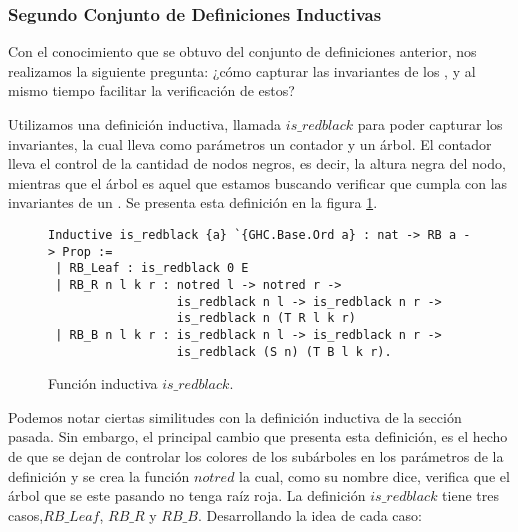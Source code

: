 \subsubsection{Segundo Conjunto de Definiciones Inductivas}

Con el conocimiento que se obtuvo del conjunto de definiciones anterior, nos realizamos la
siguiente pregunta: ¿c\'omo capturar las invariantes de los {\arns}, y al mismo tiempo facilitar la
verificaci\'on de estos?

Utilizamos una definición inductiva, llamada \hyperref[inductive_isRedB]{$is\_redblack$} para poder 
capturar los invariantes, la cual lleva como parámetros un contador y un \'arbol. El contador lleva 
el control de la cantidad de nodos negros, es decir, la altura negra del nodo, mientras que el 
\'arbol es aquel que estamos buscando verificar que cumpla con las invariantes de un {\arn}. Se 
presenta esta definici\'on en la figura \ref{inductive_isRedB}.

\begin{figure}[!ht]
\centering
\captionsetup{justification=centering}
\begin{verbatim}
Inductive is_redblack {a} `{GHC.Base.Ord a} : nat -> RB a -> Prop :=
 | RB_Leaf : is_redblack 0 E
 | RB_R n l k r : notred l -> notred r ->
                  is_redblack n l -> is_redblack n r ->
                  is_redblack n (T R l k r)
 | RB_B n l k r : is_redblack n l -> is_redblack n r ->
                  is_redblack (S n) (T B l k r).
\end{verbatim}
\caption{Funci\'on inductiva $is\_redblack$.}
\label{inductive_isRedB}
\end{figure}

Podemos notar ciertas similitudes con la definición inductiva de la secci\'on pasada. Sin
embargo, el principal cambio que presenta esta definición, es el hecho de que se dejan de controlar
los colores de los subárboles en los parámetros de la definici\'on y se crea la funci\'on $notred$
la cual, como su nombre dice, verifica que el \'arbol que se este pasando no tenga raíz roja. La
definici\'on \hyperref[inductive_isRedB]{$is\_redblack$} tiene tres casos,$RB\_Leaf$, $RB\_R$ y 
$RB\_B$. Desarrollando la idea de cada caso:

